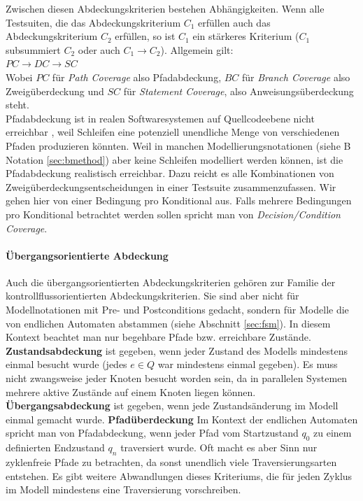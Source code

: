 Zwischen diesen Abdeckungskriterien bestehen Abhängigkeiten. Wenn alle Testsuiten, die das Abdeckungskriterium $C_1$ erfüllen auch das Abdeckungskriterium $C_2$ erfüllen, so ist $C_1$ ein stärkeres Kriterium ($C_1$ subsummiert $C_2$ oder auch $C_1 \longrightarrow C_2$). Allgemein gilt:\\
$ PC \longrightarrow DC \longrightarrow SC $\\
Wobei $PC$ für \textit{Path Coverage} also Pfadabdeckung, $BC$ für \textit{Branch Coverage} also Zweigüberdeckung und $SC$ für \textit{Statement Coverage}, also Anweisungsüberdeckung steht.\\
Pfadabdeckung ist in realen Softwaresystemen auf Quellcodeebene nicht erreichbar \cite{utting_practical_2007}, weil Schleifen eine potenziell unendliche Menge von verschiedenen Pfaden produzieren könnten. Weil in manchen Modellierungsnotationen (siehe B Notation \ref{sec:bmethod}) aber keine Schleifen modelliert werden können, ist die Pfadabdeckung realistisch erreichbar. Dazu reicht es alle Kombinationen von Zweigüberdeckungsentscheidungen in einer Testsuite zusammenzufassen. Wir gehen hier von einer Bedingung pro Konditional aus. Falls mehrere Bedingungen pro Konditional betrachtet werden sollen spricht man von \textit{Decision/Condition Coverage}.

\paragraph{Übergangsorientierte Abdeckung}\label{coverage_transition}
Auch die übergangsorientierten Abdeckungskriterien gehören zur Familie der kontrollflussorientierten Abdeckungskriterien. Sie sind aber nicht für Modellnotationen mit Pre- und Postconditions gedacht, sondern für Modelle die von endlichen Automaten abstammen (siehe Abschnitt \ref{sec:fsm}). In diesem Kontext beachtet man nur begehbare Pfade bzw. erreichbare Zustände.\\

\textbf{Zustandsabdeckung} ist gegeben, wenn jeder Zustand des Modells mindestens einmal besucht wurde (jedes $e \in Q$ war mindestens einmal gegeben). Es muss nicht zwangsweise jeder Knoten besucht worden sein, da in parallelen Systemen mehrere aktive Zustände auf einem Knoten liegen können.
\textbf{Übergangsabdeckung} ist gegeben, wenn jede Zustandsänderung im Modell einmal gemacht wurde.
\textbf{Pfadüberdeckung} Im Kontext der endlichen Automaten spricht man von Pfadabdeckung, wenn jeder Pfad vom Startzustand $q_0$ zu einem definierten Endzustand $q_n$ traversiert wurde. Oft macht es aber Sinn nur zyklenfreie Pfade zu betrachten, da sonst unendlich viele Traversierungsarten entstehen. Es gibt weitere Abwandlungen dieses Kriteriums, die für jeden Zyklus im Modell mindestens eine Traversierung vorschreiben.

